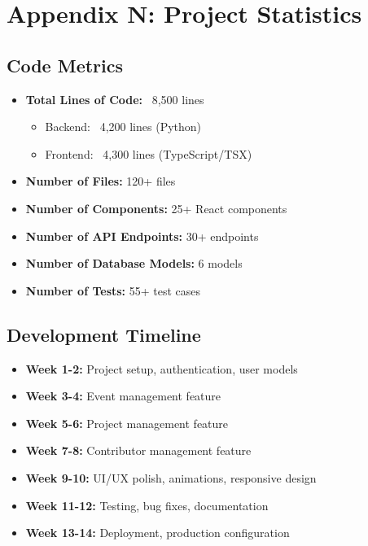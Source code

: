 \documentclass[11pt,a4paper]{article}
\begin{document}
\section{Appendix N: Project Statistics}

\subsection{Code Metrics}
\begin{itemize}[leftmargin=*]
    \item \textbf{Total Lines of Code:} ~8,500 lines
    \begin{itemize}
        \item Backend: ~4,200 lines (Python)
        \item Frontend: ~4,300 lines (TypeScript/TSX)
    \end{itemize}
    \item \textbf{Number of Files:} 120+ files
    \item \textbf{Number of Components:} 25+ React components
    \item \textbf{Number of API Endpoints:} 30+ endpoints
    \item \textbf{Number of Database Models:} 6 models
    \item \textbf{Number of Tests:} 55+ test cases
\end{itemize}


\subsection{Development Timeline}
\begin{itemize}[leftmargin=*]
    \item \textbf{Week 1-2:} Project setup, authentication, user models
    \item \textbf{Week 3-4:} Event management feature
    \item \textbf{Week 5-6:} Project management feature
    \item \textbf{Week 7-8:} Contributor management feature
    \item \textbf{Week 9-10:} UI/UX polish, animations, responsive design
    \item \textbf{Week 11-12:} Testing, bug fixes, documentation
    \item \textbf{Week 13-14:} Deployment, production configuration
\end{itemize}
\end{document}
